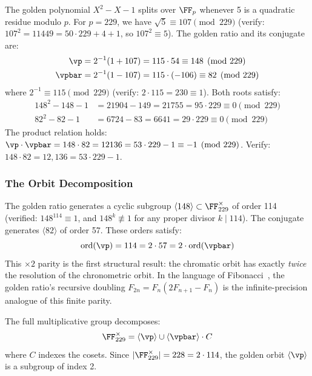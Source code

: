 The golden polynomial $X^2 - X - 1$ splits over $\FF_p$ whenever 5 is a quadratic residue modulo $p$. For $p = 229$, we have $\sqrt{5} \equiv 107 \pmod{229}$ (verify: $107^2 = 11449 = 50 \cdot 229 + 4 + 1$, so $107^2 \equiv 5$). The golden ratio and its conjugate are:
\begin{align}
\vp &= 2^{-1}(1 + 107) = 115 \cdot 54 \equiv 148 \pmod{229} \\
\vpbar &= 2^{-1}(1 - 107) = 115 \cdot (-106) \equiv 82 \pmod{229}
\end{align}
where $2^{-1} \equiv 115 \pmod{229}$ (verify: $2 \cdot 115 = 230 \equiv 1$). Both roots satisfy:
\begin{align}
148^2 - 148 - 1 &= 21904 - 149 = 21755 = 95 \cdot 229 \equiv 0 \pmod{229} \\
82^2 - 82 - 1 &= 6724 - 83 = 6641 = 29 \cdot 229 \equiv 0 \pmod{229}
\end{align}
The product relation holds: $\vp \cdot \vpbar = 148 \cdot 82 = 12136 = 53 \cdot 229 - 1 \equiv -1 \pmod{229}$. Verify: $148 \cdot 82 = 12{,}136 = 53 \cdot 229 - 1$.

\subsubsection*{The Orbit Decomposition}

The golden ratio generates a cyclic subgroup $\langle 148 \rangle \subset \FF_{229}^\times$ of order 114 (verified: $148^{114} \equiv 1$, and $148^k \not\equiv 1$ for any proper divisor $k \mid 114$). The conjugate generates $\langle 82 \rangle$ of order 57. These orders satisfy:
\begin{equation}\label{eq:parity}
\mathrm{ord}(\vp) = 114 = 2 \cdot 57 = 2 \cdot \mathrm{ord}(\vpbar)
\end{equation}
This $\times 2$ parity is the first structural result: the chromatic orbit has exactly \emph{twice} the resolution of the chronometric orbit. In the language of Fibonacci~\cite{fibonacci}, the golden ratio's recursive doubling $F_{2n} = F_n(2F_{n+1} - F_n)$ is the infinite-precision analogue of this finite parity.

The full multiplicative group decomposes:
$$\FF_{229}^\times = \langle\vp\rangle \cup \langle\vpbar\rangle \cdot C$$
where $C$ indexes the cosets. Since $|\FF_{229}^\times| = 228 = 2 \cdot 114$, the golden orbit $\langle\vp\rangle$ is a subgroup of index 2.

